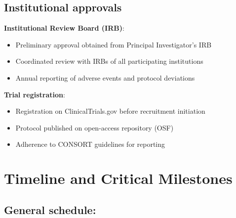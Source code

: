 \subsection{Institutional approvals}

\textbf{Institutional Review Board (IRB)}:
\begin{itemize}
    \item Preliminary approval obtained from Principal Investigator's IRB
    \item Coordinated review with IRBs of all participating institutions
    \item Annual reporting of adverse events and protocol deviations
\end{itemize}

\textbf{Trial registration}:
\begin{itemize}
    \item Registration on ClinicalTrials.gov before recruitment initiation
    \item Protocol published on open-access repository (OSF)
    \item Adherence to CONSORT guidelines for reporting
\end{itemize}

\newpage
\section{Timeline and Critical Milestones}
\subsection*{General schedule:}

